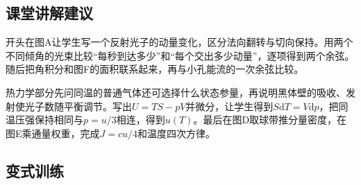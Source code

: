 \documentclass[UTF8,fontset=fandol,a4paper,11pt]{ctexart}
\begin{document}

\subsection*{课堂讲解建议}

开头在图A让学生写一个反射光子的动量变化，区分法向翻转与切向保持。用两个不同倾角的光束比较“每秒到达多少”和“每个交出多少动量”，逐项得到两个余弦。随后把角积分和图F的面积联系起来，再与小孔能流的一次余弦比较。

热力学部分先问同温的普通气体还可选择什么状态参量，再说明黑体壁的吸收、发射使光子数随平衡调节。写出$U=TS-pV$并微分，让学生得到$S\mathrm dT=V\mathrm dp$，把同温压强保持相同与$p=u/3$相连，得到$u(T)$。最后在图D取球带推分量密度，在图E乘通量权重，完成$J=cu/4$和温度四次方律。



\subsection*{变式训练}
\end{document}

